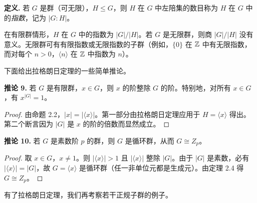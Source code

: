 \noindent\textbf{定义.} 若 $G$ 是群（可无限），$H\leq G$，则 $H$ 在 $G$ 中左陪集的数目称为 $H$ 在 $G$ 中的\emph{指数}，记为 $|G:H|$。

在有限群情形，$H$ 在 $G$ 中的指数为 $|G|/|H|$。若 $G$ 是无限群，则商 $|G|/|H|$ 没有意义。无限群可有有限指数或无限指数的子群（例如，$\{0\}$ 在 $\mathbb{Z}$ 中有无限指数，而对每个 $n>0$，$\langle n\rangle$ 在 $\mathbb{Z}$ 中指数为 $n$）。

下面给出拉格朗日定理的一些简单推论。

\medskip
\noindent\textbf{推论 9.} 若 $G$ 是有限群，$x\in G$，则 $x$ 的阶整除 $G$ 的阶。特别地，对所有 $x\in G$，有 $x^{|G|}=1$。

\begin{proof}
由命题 2.2，$|x|=|\langle x\rangle|$。第一部分由拉格朗日定理应用于 $H=\langle x\rangle$ 得出。第二个断言因为 $|G|$ 是 $x$ 的阶的倍数而显然成立。
\end{proof}

\medskip
\noindent\textbf{推论 10.} 若 $G$ 是素数阶 $p$ 的群，则 $G$ 是循环群，从而 $G\cong Z_p$。

\begin{proof}
取 $x\in G$，$x\neq1$。则 $|\langle x\rangle|>1$ 且 $|\langle x\rangle|$ 整除 $|G|$。由于 $|G|$ 是素数，必有 $|\langle x\rangle|=|G|$，故 $G=\langle x\rangle$ 是循环群（任一非单位元都是生成元）。由定理 2.4 得 $G\cong Z_p$。
\end{proof}

有了拉格朗日定理，我们再考察若干正规子群的例子。


